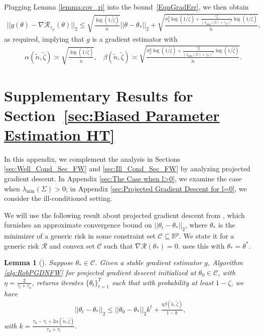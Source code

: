 \documentclass{article}
\newtheorem{lemma}{Lemma}
\begin{document}
Plugging Lemma \ref{lemma:cov_ri} into the bound~\eqref{EqnGradErr}, we then obtain
\begin{align*}
||g(\theta) - \nabla\mathcal{R}_{\gamma_{\mathcal{C}}}(\theta)||_2 \leq \sqrt{\frac{\log(1/\widetilde{\zeta})}{\widetilde{n}}}||\theta - \theta_*||_2 + \sqrt{\frac{\sigma_2^2\log(1/\widetilde{\zeta}) + \frac{\gamma_{\mathcal{C}}^2}{(\lambda_{\min}(\Sigma) + \gamma_{\mathcal{C}})^2}\log(1/\widetilde{\zeta})}{\widetilde{n}}},
\end{align*}
as required, implying that $g$ is a gradient estimator with
\begin{align*}
&\alpha(\widetilde{n}, \widetilde{\zeta}) \asymp \sqrt{\frac{\log(1/\widetilde{\zeta})}{\widetilde{n}}},
&\beta(\widetilde{n}, \widetilde{\zeta}) \asymp \sqrt{\frac{\sigma_2^2\log(1/\widetilde{\zeta}) + \frac{\gamma_{\mathcal{C}}^2}{(\lambda_{\min}(\Sigma) + \gamma_{\mathcal{C}})^2}\log(1/\widetilde{\zeta})}{\widetilde{n}}}.
\end{align*}


\section{Supplementary Results for Section~\ref{sec:Biased Parameter Estimation HT}}
\label{Appendix Extra}

In this appendix, we complement the analysis in Sections \ref{sec:Well_Cond_Sec_FW} and \ref{sec:Ill_Cond_Sec_FW} by analyzing projected gradient descent. In Appendix \ref{sec:The Case when l>0}, we examine the case when $\lambda_{\min}(\Sigma) > 0$; in Appendix \ref{sec:Projected Gradient Descent for l=0}, we consider the ill-conditioned setting.

We will use the following result about projected gradient descent from \cite{RE}, which furnishes an approximate convergence bound on $||\theta_t - \theta_*||_2$, where $\theta_*$ is the minimizer of a generic risk in some constraint set $\mathcal{C} \subseteq \mathbb{R}^p$.
We state it for a generic risk $\mathcal{R}$ and convex set $\mathcal{C}$ such that $\nabla\mathcal{R}(\theta_{*}) = 0$. \cite{RE} uses this with $\theta_* = \theta^*$.

\begin{lemma}[\cite{RE}]
\label{lemma:GD}
Suppose $\theta_* \in \mathcal{C}$. Given a stable gradient estimator $g$, Algorithm \ref{alg:RobPGDNFW} for projected gradient descent initialized at $\theta_0 \in \mathcal{C}$, with $\eta = \frac{2}{\tau_l + \tau_u}$, returns iterates $\{\theta_t\}_{t = 1}^T$ such that with probability at least $1 - \zeta$, we have 
\begin{align*}
||\theta_t - \theta_{*}||_2 \leq ||\theta_0 - \theta_{*}||_2k^t + \frac{\eta\beta(\widetilde{n}, \widetilde{\zeta})}{1 - k},
\end{align*}
with $k = \frac{\tau_u - \tau_l + 2\alpha(\widetilde{n}, \widetilde{\zeta})}{\tau_u + \tau_l}$.
\end{lemma}
\end{document}
